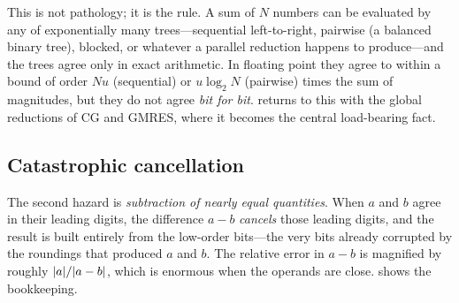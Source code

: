 This is not pathology; it is the rule. A sum of $N$ numbers can be evaluated by any
of exponentially many trees---sequential left-to-right, pairwise (a balanced
binary tree), blocked, or whatever a parallel reduction happens to produce---and
the trees agree only in exact arithmetic. In floating point they agree to within a
bound of order $N u$ (sequential) or $u\log_2 N$ (pairwise) times the sum of
magnitudes, but they do not agree \emph{bit for bit}.  returns
to this with the global reductions of CG and GMRES, where it becomes the central
load-bearing fact.

\subsection{Catastrophic cancellation}
\label{sec:cancel}

The second hazard is \emph{subtraction of nearly equal quantities}. When $a$ and
$b$ agree in their leading digits, the difference $a - b$ \emph{cancels} those
leading digits, and the result is built entirely from the low-order bits---the very
bits already corrupted by the roundings that produced $a$ and $b$. The relative
error in $a - b$ is magnified by roughly $\lvert a\rvert/\lvert a-b\rvert$, which is enormous
when the operands are close.  shows the bookkeeping.

